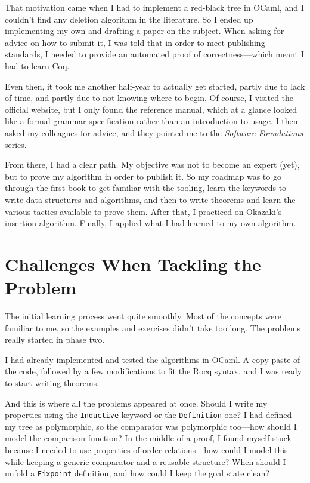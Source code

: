 \documentclass[11pt]{article}
\begin{document}
That motivation came when I had to implement a red-black tree in OCaml, and I couldn't find any deletion algorithm in the literature. So I ended up implementing my own and drafting a paper on the subject. When asking for advice on how to submit it, I was told that in order to meet publishing standards, I needed to provide an automated proof of correctness---which meant I had to learn Coq.

Even then, it took me another half-year to actually get started, partly due to lack of time, and partly due to not knowing where to begin. Of course, I visited the official website, but I only found the reference manual, which at a glance looked like a formal grammar specification rather than an introduction to usage. I then asked my colleagues for advice, and they pointed me to the \textit{Software Foundations} series.

From there, I had a clear path. My objective was not to become an expert (yet), but to prove my algorithm in order to publish it. So my roadmap was to go through the first book to get familiar with the tooling, learn the keywords to write data structures and algorithms, and then to write theorems and learn the various tactics available to prove them. After that, I practiced on Okazaki's insertion algorithm. Finally, I applied what I had learned to my own algorithm.

\section{Challenges When Tackling the Problem}
The initial learning process went quite smoothly. Most of the concepts were familiar to me, so the examples and exercises didn't take too long. The problems really started in phase two.

I had already implemented and tested the algorithms in OCaml. A copy-paste of the code, followed by a few modifications to fit the Rocq syntax, and I was ready to start writing theorems.

And this is where all the problems appeared at once. Should I write my properties using the \texttt{Inductive} keyword or the \texttt{Definition} one? I had defined my tree as polymorphic, so the comparator was polymorphic too---how should I model the comparison function? In the middle of a proof, I found myself stuck because I needed to use properties of order relations---how could I model this while keeping a generic comparator and a reusable structure? When should I unfold a \texttt{Fixpoint} definition, and how could I keep the goal state clean?
\end{document}
